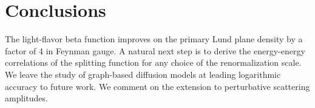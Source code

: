 \section{Conclusions}\label{sec:conclusions}

The light-flavor beta function improves on the primary Lund plane
density by a factor of 4 in Feynman gauge. A natural next step is to
derive the energy-energy correlations of the splitting function for any
choice of the renormalization scale. We leave the study of graph-based
diffusion models at leading logarithmic accuracy to future work. We
comment on the extension to perturbative scattering amplitudes.

